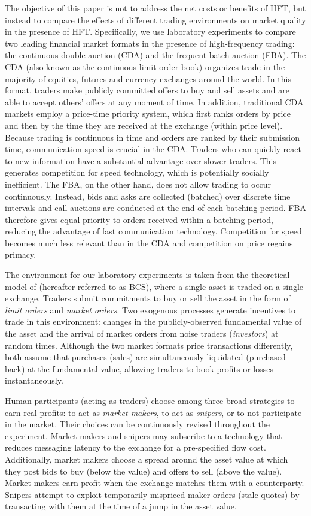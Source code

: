 \documentclass[12pt]{article}
\begin{document}
The objective of this paper is not to address the net costs or benefits of HFT, but instead to compare the effects of different trading environments on market quality in the presence of HFT. Specifically, we use laboratory experiments to compare two leading financial market formats in the presence of high-frequency trading: the continuous double auction (CDA) and the frequent batch auction (FBA). The CDA (also known as the continuous limit order book) organizes trade in the majority of equities, futures and currency exchanges around the world. In this format, traders make publicly committed offers to buy and sell assets and are able to accept others’ offers at any moment of time. In addition, traditional CDA markets employ a price-time priority system, which first ranks orders by price and then by the time they are received at the exchange (within price level). Because trading is continuous in time and orders are ranked by their submission time, communication speed is crucial in the CDA. Traders who can quickly react to new information have a substantial advantage over slower traders. This generates competition for speed technology, which is potentially socially inefficient. The FBA, on the other hand, does not allow trading to occur continuously. Instead, bids and asks are collected (batched) over discrete time intervals and call auctions are conducted at the end of each batching period. FBA therefore gives equal priority to orders received within a batching period, reducing the advantage of fast communication technology. Competition for speed becomes much less relevant than in the CDA and competition on price regains primacy. 

The environment for our laboratory experiments is taken from the theoretical model of \cite{Budish2015} (hereafter referred to as BCS), where a single asset is traded on a single exchange. Traders submit commitments to buy or sell the asset in the form of \textit{limit orders} and \textit{market orders}. Two exogenous processes generate incentives to trade in this environment: changes in the publicly-observed fundamental value of the asset and the arrival of market orders from noise traders (\textit{investors}) at random times. Although the two market formats price transactions differently, both assume that purchases (sales) are simultaneously liquidated (purchased back) at the fundamental value, allowing traders to book profits or losses instantaneously.

Human participants (acting as traders) choose among three broad strategies to earn real profits: to act as \textit{market makers}, to act as \textit{snipers}, or to not participate in the market. Their choices can be continuously revised throughout the experiment. Market makers and snipers may subscribe to a technology that reduces messaging latency to the exchange for a pre-specified flow cost.
Additionally, market makers choose a spread around the asset value at which they post bids to buy (below the value) and offers to sell (above the value). Market makers earn profit when the exchange matches them with a counterparty. Snipers attempt to exploit temporarily mispriced maker orders (stale quotes) by transacting with them at the time of a jump in the asset value.
\end{document}
